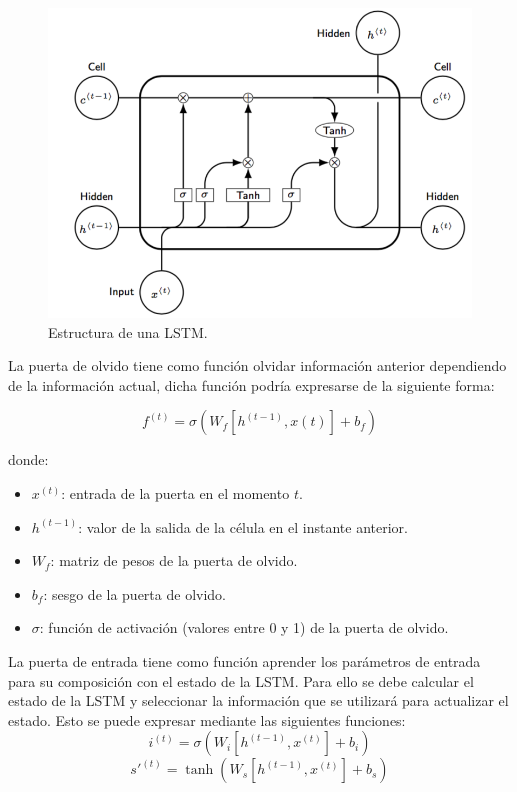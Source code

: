 \newpage

\begin{figure}[H]
	\centering
	\includegraphics[width=120mm]{imagenes/lstm-struct.png}
	\caption{Estructura de una LSTM.}
	\label{fig:22}
\end{figure}
\verticalspace

La puerta de olvido tiene como función olvidar información anterior dependiendo de la información actual, dicha función podría expresarse de la siguiente forma:

$$ f^{(t)} = \sigma( W_f[h^{(t-1)}, x(t)] + b_f) $$

\noindent donde:
\begin{itemize}
	\item $x^{(t)}$: entrada de la puerta en el momento $t$.
	\item $h^{(t-1)} $: valor de la salida de la célula en el instante anterior.
	\item $W_f $: matriz de pesos de la puerta de olvido.
	\item $b_f $: sesgo de la puerta de olvido.
	\item $\sigma$: función de activación (valores entre 0 y 1) de la puerta de olvido.
\end{itemize}
\verticalspace

La puerta de entrada tiene como función aprender los parámetros de entrada para su composición con el estado de la LSTM. Para ello se debe calcular el estado de la LSTM y seleccionar la información que se utilizará para actualizar el estado. Esto se puede expresar mediante las siguientes funciones:\newline
$$ i^{(t)} = \sigma(W_i[h^{(t-1)}, x^{(t)}] + b_i) $$
$$ s'^{(t)} = \tanh(W_s[h^(t-1), x^{(t)}] + b_s) $$

